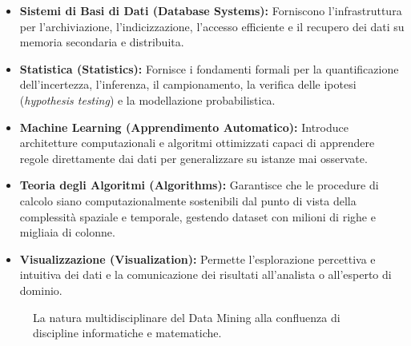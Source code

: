 \begin{itemize}
    \item \textbf{Sistemi di Basi di Dati (Database Systems):} Forniscono l'infrastruttura per l'archiviazione, l'indicizzazione, l'accesso efficiente e il recupero dei dati su memoria secondaria e distribuita.
    \item \textbf{Statistica (Statistics):} Fornisce i fondamenti formali per la quantificazione dell'incertezza, l'inferenza, il campionamento, la verifica delle ipotesi (\textit{hypothesis testing}) e la modellazione probabilistica.
    \item \textbf{Machine Learning (Apprendimento Automatico):} Introduce architetture computazionali e algoritmi ottimizzati capaci di apprendere regole direttamente dai dati per generalizzare su istanze mai osservate.
    \item \textbf{Teoria degli Algoritmi (Algorithms):} Garantisce che le procedure di calcolo siano computazionalmente sostenibili dal punto di vista della complessit\`a spaziale e temporale, gestendo dataset con milioni di righe e migliaia di colonne.
    \item \textbf{Visualizzazione (Visualization):} Permette l'esplorazione percettiva e intuitiva dei dati e la comunicazione dei risultati all'analista o all'esperto di dominio.
\end{itemize}

\begin{figure}[H]
\centering
{}
\caption{La natura multidisciplinare del Data Mining alla confluenza di discipline informatiche e matematiche.}
\label{fig:confluenza-discipline}
\end{figure}

